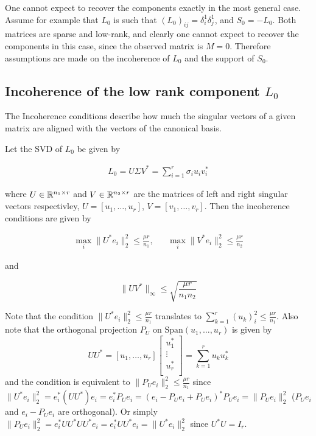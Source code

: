 \documentclass{../../common/projectreport}
\begin{document}
One cannot expect to recover the components exactly in the most general case. Assume for example that $L_0$ is such that $(L_0)_{ij} = \delta_i^1\delta_j^1$, and $S_0 = -L_0$. Both matrices are sparse and low-rank, and clearly one cannot expect to recover the components in this case, since the observed matrix is $M = 0$. Therefore assumptions are made on the incoherence of $L_0$ and the support of $S_0$.


\subsection{Incoherence of the low rank component $L_0$}
The Incoherence conditions describe how much the singular vectors of a given matrix are aligned with the vectors of the canonical basis.

Let the SVD of $L_0$ be given by

\begin{align}
L_0 = U\Sigma V^* = \sum_{i=1}^r \sigma_i u_i v_i^*
\label{eq:svd}
\end{align}

where $U \in {\mathbb R}^{n_1 \times r}$ and $V \in {\mathbb R}^{n_2 \times r}$ are the matrices of left and right singular vectors respectivley, $U = [u_1, \dots, u_r]$, $V = [v_1, \dots, v_r]$. Then the incoherence conditions are given by

\begin{equation}
\begin{aligned}
\max_i \|U^*e_i\|_2^2 \leq \frac{\mu r}{n_1}, && \max_i \|V^*e_i\|_2^2 \leq \frac{\mu r}{n_2}
\label{eq:incoherence1}
\end{aligned}
\end{equation}

and

\begin{equation}
\| U V^* \|_\infty \leq \sqrt{\frac{\mu r}{n_1 n_2}}
\label{eq:incoherence2}
\end{equation}

Note that the condition $\|U^*e_i\|_2^2 \leq \frac{\mu r}{n_1}$ translates to $\sum_{k = 1}^r (u_k)_i^2 \leq \frac{\mu r}{n_1}$.  Also note that the orthogonal projection $P_U$ on $\text{Span}(u_1, \dots, u_r)$ is given by
\[
UU^* = [u_1, \dots, u_r]
\left[ \begin{array}{c}
u_1^* \\
\vdots \\
u_r^* \\
\end{array} \right]
= \sum_{k = 1}^r u_ku_k^*
\]
and the condition is equivalent to $\|P_U e_i \|_2^2 \leq \frac{\mu r}{n_1}$ since $\|U^* e_i \|_2^2 = e_i^*(UU^*)e_i = e_i^* P_U e_i = (e_i - P_Ue_i + P_U e_i )^*P_U e_i = \|P_U e_i\|_2^2$ ($P_U e_i$ and $e_i - P_U e_i$ are orthogonal). Or simply $\|P_U e_i\|_2^2 = e_i^* UU^*UU^*e_i = e_i^* UU^*e_i = \|U^*e_i\|_2^2$ since $U^*U = I_r$.
\end{document}
